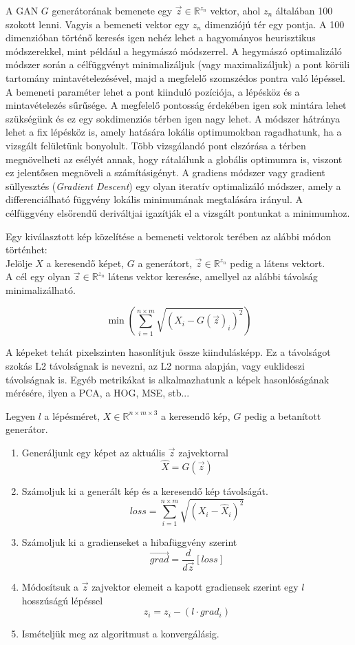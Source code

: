 A GAN $G$ generátorának bemenete egy $\vec{z} \in \mathbb{R}^{z_n}$ vektor, ahol $z_n$ általában 100 szokott lenni. Vagyis a bemeneti vektor egy $z_n$ dimenziójú tér egy pontja. A 100 dimenzióban történő keresés igen nehéz lehet a hagyományos heurisztikus módszerekkel, mint például a hegymászó módszerrel. A hegymászó optimalizáló módszer során a célfüggvényt minimalizáljuk (vagy maximalizáljuk) a pont körüli tartomány mintavételezésével, majd a megfelelő szomszédos pontra való lépéssel. A bemeneti paraméter lehet a pont kiinduló pozíciója, a lépésköz és a mintavételezés sűrűsége. A megfelelő pontosság érdekében igen sok mintára lehet szükségünk és ez egy sokdimenziós térben igen nagy lehet. A módszer hátránya lehet a fix lépésköz is, amely hatására lokális optimumokban ragadhatunk, ha a vizsgált felületünk bonyolult. Több vizsgálandó pont elszórása a térben megnövelheti az esélyét annak, hogy rátalálunk a globális optimumra is, viszont ez jelentősen megnöveli a számításigényt.
A gradiens módszer vagy gradient süllyesztés (\textit{Gradient Descent}) egy olyan iteratív optimalizáló módszer, amely a differenciálható függvény lokális minimumának megtalására irányul. A célfüggvény elsőrendű deriváltjai igazítják el a vizsgált pontunkat a minimumhoz.

Egy kiválasztott kép közelítése a bemeneti vektorok terében az alábbi módon történhet:\\ 
Jelölje $X$ a keresendő képet, $G$ a generátort, $\vec{z} \in \mathbb{R}^{z_n}$ pedig a látens vektort.\\
A cél egy olyan $\vec{z} \in \mathbb{R}^{z_n}$ látens vektor keresése, amellyel az alábbi távolság minimalizálható.

$$ \min\left(\sum_{i=1}^{n\times m}\sqrt{(X_i-G(\vec{z})_i)^2}\right)$$

A képeket tehát pixelszinten hasonlítjuk össze kiindulásképp. Ez a távolságot szokás L2 távolságnak is nevezni, az L2 norma alapján, vagy euklideszi távolságnak is.
Egyéb metrikákat is alkalmazhatunk a képek hasonlóságának mérésére, ilyen a PCA, a HOG, MSE, stb...

Legyen $l$ a lépésméret, $X \in \mathbb{R}^{n\times m \times 3}$ a keresendő kép, $G$ pedig a betanított generátor.
\begin{enumerate}
	\item Generáljunk egy képet az aktuális $\vec{z}$ zajvektorral
$$\hat X = G(\vec{z})$$
	\item Számoljuk ki a generált kép és a keresendő kép távolságát.
$$ loss = \sum_{i=1}^{n\times m}\sqrt{(X_i-\hat X_i)^2} $$
	\item Számoljuk ki a gradienseket a hibafüggvény szerint
$$ \vec{grad} = \frac{d}{d\vec{z}} \left[loss\right]$$
	\item Módosítsuk a $\vec{z}$ zajvektor elemeit a kapott gradiensek szerint egy $l$ hosszúságú lépéssel
$$ z_i = z_i - (l \cdot grad_i)$$
	\item Ismételjük meg az algoritmust a konvergálásig.
\end{enumerate}

